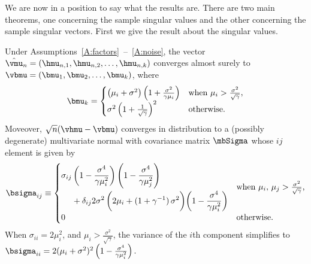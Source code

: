We are now in a position to say what the results are.  There are two main
theorems, one concerning the sample singular values and the other concerning
the sample singular vectors.  First we give the result about the singular
values.
\begin{theorem}\label{T:spiked-eigenvalue-limits}
    Under Assumptions~\ref{A:factors}~--~\ref{A:noise},
    the vector $\hat \vmu_n = (\hmu_{n,1}, \hmu_{n,2}, \ldots, \hmu_{n,k})$
    converges almost surely to 
    $\vbmu = (\bmu_1, \bmu_2, \ldots, \bmu_k)$,
    where
    \[
        \bmu_k
        =
        \begin{cases}
            \left( \mu_i + \sigma^2 \right)
            \left( 1 + \frac{\sigma^2}{\gamma \mu_i} \right)
                &\text{when $\mu_i > \frac{\sigma^2}{\sqrt{\gamma}}$}, \\
            \sigma^2 \left( 1 + \frac{1}{\sqrt{\gamma}} \right)^2
                &\text{otherwise.}
        \end{cases}
    \]
    Moveover, 
    \(
        \sqrt{n} (\vhmu - \vbmu)
    \)
    converges in distribution to a (possibly degenerate) multivariate normal
    with covariance matrix $\mbSigma$ whose $ij$ element is given by
    \[
        \bsigma_{ij}
        \equiv
        \begin{cases}
            \begin{aligned}
                \sigma_{ij}
                &\left(
                    1 - \frac{\sigma^4}{\gamma \mu_i^2}
                \right)
                \left(
                    1 - \frac{\sigma^4}{\gamma \mu_j^2}
                \right)
                \\
                &+ \delta_{ij}
                2
                \sigma^2 \,
                \bigg(
                    2 \mu_i + (1 + \gamma^{-1}) \, \sigma^2
                \bigg)
                \bigg(
                    1 - \frac{ \sigma^4 }{ \gamma  \mu_i^2 }
                \bigg)
            \end{aligned}
                &\text{when $\mu_i, \, \mu_j >
                           \frac{\sigma^2}{\sqrt{\gamma}}$,} \\
            0
                &\text{otherwise.}
        \end{cases}
    \]
    When $\sigma_{ii} = 2 \mu_i^2$, 
    and $\mu_i > \frac{\sigma^2}{\sqrt{\gamma}}$, the variance of the $i$th
    component simplifies to
    \(
        \bsigma_{ii} 
        = 
        2 (\mu_i + \sigma^2)^2 
        \left( 1 - \frac{\sigma^4}{\gamma \mu_i^2} \right).
    \)
\end{theorem}

